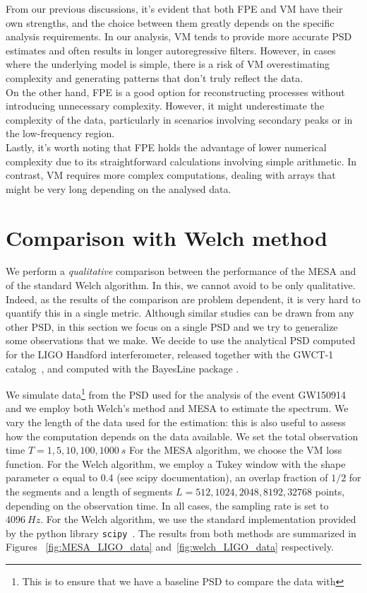 \documentclass{aa}
\begin{document}
From our previous discussions, it's evident that both FPE and VM have their own strengths, and the choice between them greatly depends on the specific analysis requirements. In our analysis, VM tends to provide more accurate PSD estimates and often results in longer autoregressive filters. However, in cases where the underlying model is simple, there is a risk of VM overestimating complexity and generating patterns that don't truly reflect the data.\\ 
On the other hand, FPE is a good option for reconstructing processes without introducing unnecessary complexity. However, it might underestimate the complexity of the data, particularly in scenarios involving secondary peaks or in the low-frequency region.\\ 

Lastly, it's worth noting that FPE holds the advantage of lower numerical complexity due to its straightforward calculations involving simple arithmetic. In contrast, VM requires more complex computations, dealing with arrays that might be very long depending on the analysed data.

\section{Comparison with Welch method}\label{sec:Welch_comparison}

We perform a {\it qualitative} comparison between the performance of the MESA and of the standard Welch algorithm.
In this, we cannot avoid to be only qualitative. Indeed, as the results of the comparison are problem dependent, it is very hard to quantify this in a single metric. Although similar studies can be drawn from any other PSD, in this section we focus on a single PSD and we try to generalize some observations that we make.
We decide to use the analytical PSD computed for the LIGO Handford interferometer, released together with the GWCT-1 catalog~\citep{GWTC1, PSD_release}, and computed with the BayesLine package \citep{Cornish_2015, Littenberg_2015, Cornish_2020, Chatziioannou_2019}.

We simulate data\footnote{This is to ensure that we have a baseline PSD to compare the data with} from the PSD used for the analysis of the event GW150914 and we employ both Welch's method and MESA to estimate the spectrum.
We vary the length of the data used for the estimation: this is also useful to assess how the computation depends on the data available. We set the total observation time $T = 1, 5, 10, 100, 1000 \SI{}{s}$
For the MESA algorithm, we choose the VM loss function. For the Welch algorithm, we employ a Tukey window with the shape parameter $\alpha$ 
equal to 0.4 (see scipy documentation), an overlap fraction of $1/2$ for the segments and a length of 
segments $L = 512, 1024, 2048, 8192, 32768$ points, depending on the observation time.
In all cases, the sampling rate is set to $\SI{4096}{Hz}$.
For the Welch algorithm, we use the standard implementation provided by the python library \texttt{scipy}~\citep{numpy,scipy}.
The results from both methods are summarized in  Figures ~\ref{fig:MESA_LIGO_data} and~\ref{fig:welch_LIGO_data} respectively.
\end{document}
